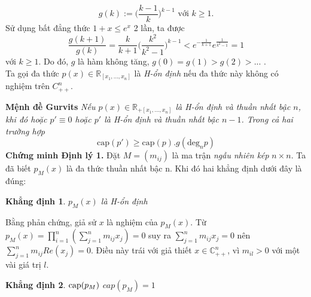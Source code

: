 \documentclass[a4paper, 12pt]{report}
\newtheorem{claim}{Khẳng định}
\begin{document}
\begin{equation*}
	g(k) := \Big( \frac{k-1}{k} \Big)^{k-1}  \textrm{                   với    } k \geq 1.
\end{equation*}
Sử dụng bất đẳng thức $1 +x \leq e^x$ 2 lần, ta được
\begin{equation*}
	\frac{g(k+1)}{g(k)} = \frac{k}{k+1} \Big( \frac{k^2}{k^2 - 1}\Big) ^{k-1} < e^{-\frac{1}{k+1}}e^{\frac{1}{k^2 - 1}} =1
\end{equation*}
với $k \geq 1$. Do đó, $g$ là hàm không tăng, $g(0) = g(1) > g(2) > ...$ .\\
Ta gọi đa thức $p(x) \in \mathbb{R}_{[x_1,...,x_n]}$ là \textit{H-ổn định} nếu đa thức này không có nghiệm trên $C_{++}^{n}$.

\textbf{Mệnh đề Gurvits}
\textit{Nếu $p(x) \in \mathbb{R}_{+[x_1,...,x_n]}$ là H-ổn định và thuần nhất bậc $n$, khi đó hoặc $p' \equiv 0$ hoặc $p'$ là H-ổn định và thuần nhất bậc $n-1$. Trong cả hai trường hợp}
\begin{equation}
 \textrm{cap}(p') \geq \textrm{cap}(p).g(\textrm{deg}_{n}p) \label{Gurvits}
\end{equation}
\textbf{Chứng minh Định lý 1.}
Đặt $M=(m_{ij})$ là ma trận \textit{ngẫu nhiên kép} $n \times n$. Ta đã biết $p_M(x)$ là đa thức thuần nhất bậc n. Khi đó hai khẳng định dưới đây là đúng:
\begin{claim}
	$p_M(x)$ là H-ổn định
\end{claim}
Bằng phản chứng, giả sử $x$ là nghiệm của $p_M(x)$. Từ $p_M(x) = \prod_{i=1}^{n} (\sum_{j=1}^{n} m_{ij}x_{j}) =0$ suy ra $\sum_{j=1}^{n} m_{ij}x_{j} =0$ nên $\sum_{j=1}^{n} m_{ij}Re(x_{j}) =0$. Điều này trái với giả thiết $x \in \mathbb{C}^{n}_{++}$, vì $m_{il} > 0$ với một vài giá trị $l$. 
\begin{claim}
	$\hbox{cap}(p_M)$
	$cap(p_M) =1$
\end{claim}
\end{document}
